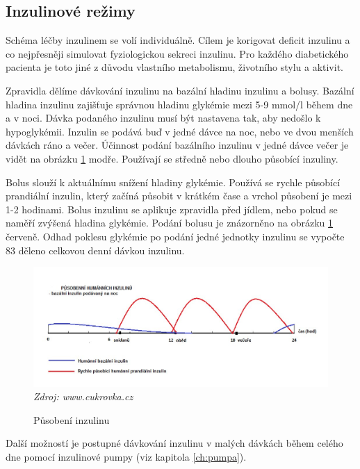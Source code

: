 \subsection{Inzulinové režimy}
\label{ch:inzulin}

Schéma léčby inzulinem se volí individuálně. Cílem je korigovat deficit inzulinu a co nejpřesněji simulovat fyziologickou sekreci inzulinu. Pro každého diabetického pacienta je toto jiné z důvodu vlastního metabolismu, životního stylu a aktivit.

Zpravidla dělíme dávkování inzulinu na bazální hladinu inzulinu a bolusy. Bazální hladina inzulinu zajišťuje správnou hladinu glykémie mezi 5-9 mmol/l během dne a v noci. Dávka podaného inzulinu musí být nastavena tak, aby nedošlo k hypoglykémii. Inzulin se podává buď v jedné dávce na noc, nebo ve dvou menších dávkách ráno a večer. Účinnost podání bazálního inzulinu v jedné dávce večer je vidět na obrázku \ref{fig:inzulin} modře. Používají se středně nebo dlouho působící inzuliny.

Bolus slouží k aktuálnímu snížení hladiny glykémie. Používá se rychle působící prandiální inzulin, který začíná působit v krátkém čase a vrchol působení je mezi 1-2 hodinami. Bolus inzulinu se aplikuje zpravidla před jídlem, nebo pokud se naměří zvýšená hladina glykémie. Podání bolusu je znázorněno na obrázku \ref{fig:inzulin} červeně. Odhad poklesu glykémie po podání jedné jednotky inzulinu se vypočte 83 děleno celkovou denní dávkou inzulinu. \cite{Diabetes.Rybka,Inzulinove.rezimy}

\begin{figure}[H]
\caption{Působení inzulinu}
\label{fig:inzulin}
\centering
\includegraphics[width=1\textwidth]{img/diabetes/pusobeni-humannich-inzulinu.jpg}
\textit{Zdroj: www.cukrovka.cz \citep{cukrovka.cz}}
\end{figure}

Další možností je postupné dávkování inzulinu v malých dávkách během celého dne pomocí inzulinové pumpy (viz kapitola \ref{ch:pumpa}).


